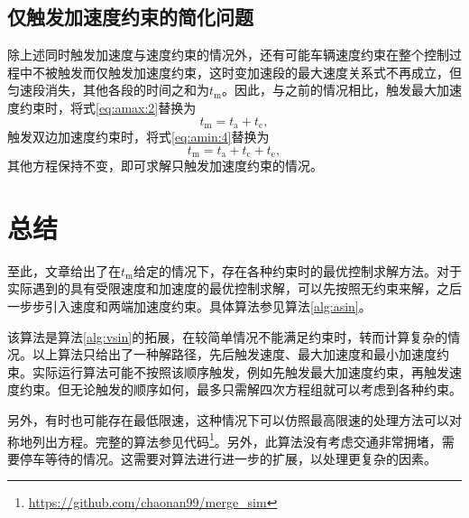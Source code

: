 \subsection{仅触发加速度约束的简化问题}
除上述同时触发加速度与速度约束的情况外，还有可能车辆速度约束在整个控制过程中不被触发而仅触发加速度约束，这时变加速段的最大速度关系式不再成立，但匀速段消失，其他各段的时间之和为$t_\mathrm{m}$。因此，与之前的情况相比，触发最大加速度约束时，将式\eqref{eq:amax:2}替换为
\begin{equation}
t_\mathrm{m}=t_\mathrm{a}+t_\mathrm{c},
\end{equation}
触发双边加速度约束时，将式\eqref{eq:amin:4}替换为
\begin{equation}
t_\mathrm{m}=t_\mathrm{a}+t_\mathrm{c}+t_\mathrm{e},
\end{equation}
其他方程保持不变，即可求解只触发加速度约束的情况。

\section{总结}
至此，文章给出了在$t_\mathrm{m}$给定的情况下，存在各种约束时的最优控制求解方法。对于实际遇到的具有受限速度和加速度的最优控制求解，可以先按照无约束来解，之后一步步引入速度和两端加速度约束。具体算法参见算法\eqref{alg:asin}。

该算法是算法\eqref{alg:vsin}的拓展，在较简单情况不能满足约束时，转而计算复杂的情况。以上算法只给出了一种解路径，先后触发速度、最大加速度和最小加速度约束。实际运行算法可能不按照该顺序触发，例如先触发最大加速度约束，再触发速度约束。但无论触发的顺序如何，最多只需解四次方程组就可以考虑到各种约束。

另外，有时也可能存在最低限速，这种情况下可以仿照最高限速的处理方法可以对称地列出方程。完整的算法参见代码\footnote{\url{https://github.com/chaonan99/merge_sim}}。另外，此算法没有考虑交通非常拥堵，需要停车等待的情况。这需要对算法进行进一步的扩展，以处理更复杂的因素。